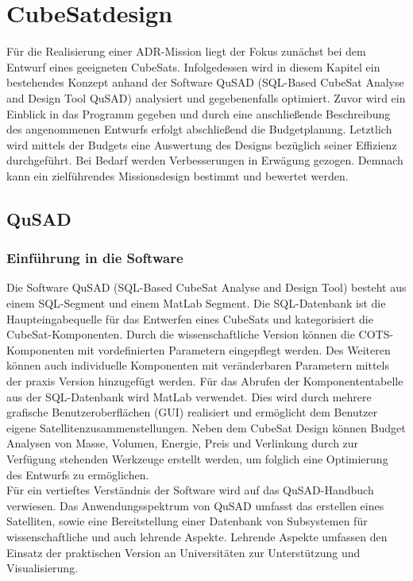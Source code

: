 \chapter{CubeSatdesign}
Für die Realisierung einer ADR-Mission liegt der Fokus zunächst bei dem Entwurf eines geeigneten CubeSats. Infolgedessen wird in diesem Kapitel ein bestehendes Konzept \cite{Lettau.} anhand der Software QuSAD (SQL-Based CubeSat Analyse and Design Tool QuSAD) analysiert und gegebenenfalls optimiert. Zuvor wird ein Einblick in das Programm gegeben und durch eine anschließende Beschreibung des angenommenen Entwurfs erfolgt abschließend die Budgetplanung. Letztlich wird mittels der Budgets eine Auswertung des Designs bezüglich seiner Effizienz durchgeführt. Bei Bedarf werden Verbesserungen in Erwägung gezogen. Demnach kann ein zielführendes Missionsdesign bestimmt und bewertet werden.
		\section{QuSAD}
			\subsection{Einführung in die Software}
Die Software QuSAD (SQL-Based CubeSat Analyse and Design Tool) besteht aus einem SQL-Segment und einem MatLab Segment. Die SQL-Datenbank ist die Haupteingabequelle für das Entwerfen eines CubeSats und kategorisiert die CubeSat-Komponenten. Durch die wissenschaftliche Version können die COTS-Komponenten mit vordefinierten Parametern eingepflegt werden. Des Weiteren können auch individuelle Komponenten mit veränderbaren Parametern mittels der praxis Version hinzugefügt werden. Für das Abrufen der Komponententabelle aus der SQL-Datenbank wird MatLab verwendet. Dies wird durch mehrere grafische Benutzeroberflächen (GUI) realisiert und ermöglicht dem Benutzer eigene Satellitenzusammenstellungen. Neben dem CubeSat Design können Budget Analysen von Masse, Volumen, Energie, Preis und Verlinkung durch zur Verfügung stehenden Werkzeuge erstellt werden, um folglich eine Optimierung des Entwurfs zu ermöglichen. \cite{} \\
Für ein vertieftes Verständnis der Software wird auf das QuSAD-Handbuch \cite{} verwiesen. Das Anwendungsspektrum von QuSAD umfasst das erstellen eines Satelliten, sowie eine Bereitstellung einer Datenbank von Subsystemen für wissenschaftliche und auch lehrende Aspekte. Lehrende Aspekte umfassen den Einsatz der praktischen Version an Universitäten zur Unterstützung und Visualisierung. \cite{}

